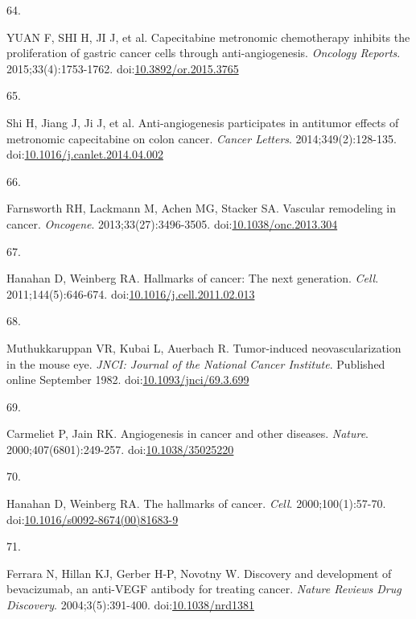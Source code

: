 \documentclass[11pt]{umnthesis}
\newlength{\csllabelwidth}
\newlength{\cslhangindent}
\newenvironment{CSLReferences}[2] %
 {%
  \setlength{\parindent}{0pt}
  \ifodd #1 \everypar{\setlength{\hangindent}{\cslhangindent}}\ignorespaces\fi
  \ifnum #2 > 0
  \setlength{\parskip}{#2\baselineskip}
  \fi
 }%
 {}
\newcommand{\CSLLeftMargin}[1]{\parbox[t]{\csllabelwidth}{#1}}
\newcommand{\CSLRightInline}[1]{\parbox[t]{\linewidth - \csllabelwidth}{#1}}
\begin{document}
\begin{CSLReferences}{0}{0}
\leavevmode{}%
\CSLLeftMargin{64. }
\CSLRightInline{YUAN F, SHI H, JI J, et al. Capecitabine metronomic chemotherapy inhibits the proliferation of gastric cancer cells through anti-angiogenesis. \emph{Oncology Reports}. 2015;33(4):1753-1762. doi:\href{https://doi.org/10.3892/or.2015.3765}{10.3892/or.2015.3765}}

\leavevmode{}%
\CSLLeftMargin{65. }
\CSLRightInline{Shi H, Jiang J, Ji J, et al. Anti-angiogenesis participates in antitumor effects of metronomic capecitabine on colon cancer. \emph{Cancer Letters}. 2014;349(2):128-135. doi:\href{https://doi.org/10.1016/j.canlet.2014.04.002}{10.1016/j.canlet.2014.04.002}}

\leavevmode{}%
\CSLLeftMargin{66. }
\CSLRightInline{Farnsworth RH, Lackmann M, Achen MG, Stacker SA. Vascular remodeling in cancer. \emph{Oncogene}. 2013;33(27):3496-3505. doi:\href{https://doi.org/10.1038/onc.2013.304}{10.1038/onc.2013.304}}

\leavevmode{}%
\CSLLeftMargin{67. }
\CSLRightInline{Hanahan D, Weinberg RA. Hallmarks of cancer: The next generation. \emph{Cell}. 2011;144(5):646-674. doi:\href{https://doi.org/10.1016/j.cell.2011.02.013}{10.1016/j.cell.2011.02.013}}

\leavevmode{}%
\CSLLeftMargin{68. }
\CSLRightInline{Muthukkaruppan VR, Kubai L, Auerbach R. Tumor-induced neovascularization in the mouse eye. \emph{{JNCI}: Journal of the National Cancer Institute}. Published online September 1982. doi:\href{https://doi.org/10.1093/jnci/69.3.699}{10.1093/jnci/69.3.699}}

\leavevmode{}%
\CSLLeftMargin{69. }
\CSLRightInline{Carmeliet P, Jain RK. Angiogenesis in cancer and other diseases. \emph{Nature}. 2000;407(6801):249-257. doi:\href{https://doi.org/10.1038/35025220}{10.1038/35025220}}

\leavevmode{}%
\CSLLeftMargin{70. }
\CSLRightInline{Hanahan D, Weinberg RA. The hallmarks of cancer. \emph{Cell}. 2000;100(1):57-70. doi:\href{https://doi.org/10.1016/s0092-8674(00)81683-9}{10.1016/s0092-8674(00)81683-9}}

\leavevmode{}%
\CSLLeftMargin{71. }
\CSLRightInline{Ferrara N, Hillan KJ, Gerber H-P, Novotny W. Discovery and development of bevacizumab, an anti-{VEGF} antibody for treating cancer. \emph{Nature Reviews Drug Discovery}. 2004;3(5):391-400. doi:\href{https://doi.org/10.1038/nrd1381}{10.1038/nrd1381}}


\end{CSLReferences}
\end{document}
